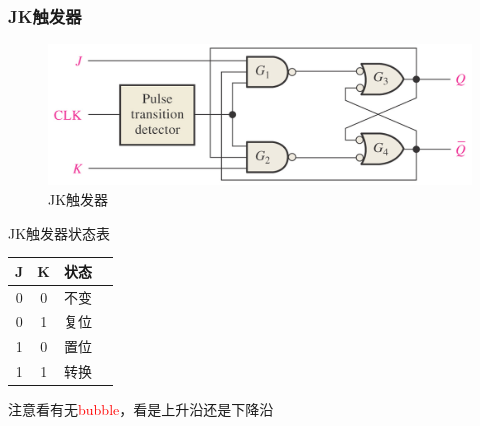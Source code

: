 \subsubsection{JK触发器}
\begin{figure}[htbp]
	\centering
	\includegraphics[width=0.6\linewidth]{fig/JK_flip-flop.png}
	\caption{JK触发器}
\end{figure}
\par JK触发器状态表
\begin{center}
\begin{tabular}{|c|c|c|c|}
\hline
J & K & 状态\\\hline
0 & 0 & 不变\\\hline
0 & 1 & 复位\\\hline
1 & 0 & 置位\\\hline
1 & 1 & 转换\\\hline
\end{tabular}
\end{center}
\par 注意看有无\textcolor{red}{bubble}，看是上升沿还是下降沿
